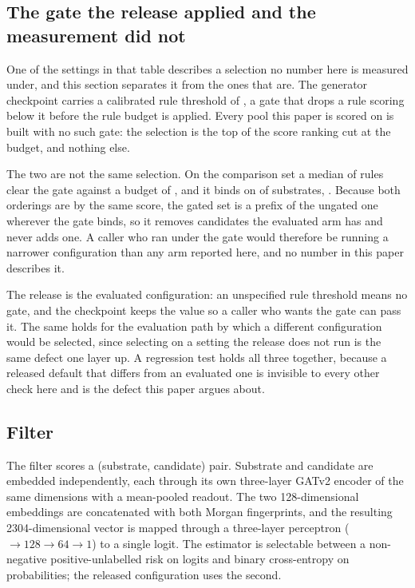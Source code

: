 \documentclass[journal=jcisd8,manuscript=suppinfo,layout=onecolumn]{achemso}
\begin{document}


\subsection{The gate the release applied and the measurement did not}

One of the settings in that table describes a selection no number here is measured under, and this
section separates it from the ones that are. The generator checkpoint carries a calibrated rule
threshold of \numDefaultgateThreshold{}, a gate that drops a rule scoring below it before the
rule budget is applied. Every pool this paper is scored on is built with no such gate: the
selection is the top of the score ranking cut at the budget, and nothing else.

The two are not the same selection. On the comparison set a median of \numDefaultgateClearing{}
rules clear the gate against a budget of \numDefaultgateBudget{}, and it binds on
\numDefaultgateBinds{} of \numPopulationN{} substrates, \numDefaultgateBindsharePct{}. Because
both orderings are by the same score, the gated set is a prefix of the ungated one wherever the
gate binds, so it removes candidates the evaluated arm has and never adds one. A caller who ran
under the gate would therefore be running a narrower configuration than any arm reported here,
and no number in this paper describes it.

The release is the evaluated configuration: an unspecified rule threshold means no gate, and the
checkpoint keeps the value so a caller who wants the gate can pass it. The same holds for the
evaluation path by which a different configuration would be selected, since selecting on a
setting the release does not run is the same defect one layer up. A regression test holds all
three together, because a released default that differs from an evaluated one is invisible to
every other check here and is the defect this paper argues about.

\subsection{Filter}

The filter scores a (substrate, candidate) pair. Substrate and candidate are embedded
independently, each through its own three-layer GATv2 encoder of the same dimensions with a
mean-pooled readout. The two 128-dimensional embeddings are concatenated with both Morgan
fingerprints, and the resulting 2304-dimensional vector is mapped through a three-layer perceptron
($\to 128 \to 64 \to 1$) to a single logit. The estimator is selectable between a non-negative
positive-unlabelled risk on logits and binary cross-entropy on probabilities; the released
configuration uses the second.
\end{document}
